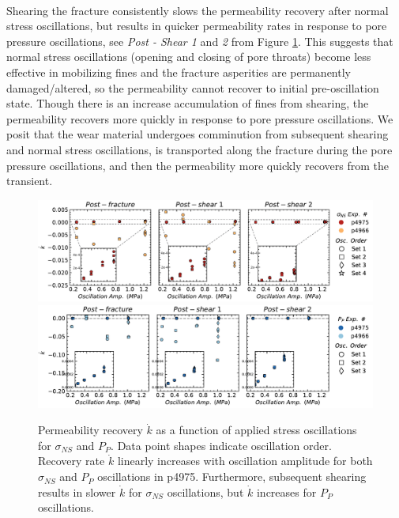 \documentclass[letterpaper,10pt]{article}
\begin{document}
\paragraph{}
Shearing the fracture consistently slows the permeability recovery after normal stress oscillations, but results in quicker permeability rates in response to pore pressure oscillations, see \textit{Post - Shear 1} and \textit{2} from Figure \ref{fig:k_recov}. This suggests that normal stress oscillations (opening and closing of pore throats) become less effective in mobilizing fines and the fracture asperities are permanently damaged/altered, so the permeability cannot recover to initial pre-oscillation state. Though there is an increase accumulation of fines from shearing, the permeability recovers more quickly in response to pore pressure oscillations. We posit that the wear material undergoes comminution from subsequent shearing and normal stress oscillations, is transported along the fracture during the pore pressure oscillations, and then the permeability more quickly recovers from the transient.

\clearpage

\begin{figure}[ht]
	\centering
	\includegraphics[width=1\columnwidth]{k_recov_amp_NS}
	\includegraphics[width=1\columnwidth]{k_recov_amp_PP}
	\caption{Permeability recovery $ \dot k $ as a function of applied stress oscillations for $ \sigma_{NS} $ and $ P_P $. Data point shapes indicate oscillation order. Recovery rate $ \dot k $ linearly increases with oscillation amplitude for both $ \sigma_{NS} $ and $ P_P $ oscillations in p4975. Furthermore, subsequent shearing results in slower $ \dot k $ for $ \sigma_{NS} $ oscillations, but $ \dot k $ increases for $ P_P $ oscillations. }
	\label{fig:k_recov}
\end{figure}
\clearpage
\end{document}
